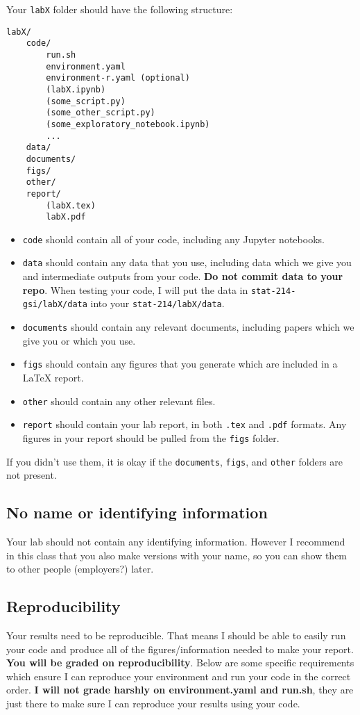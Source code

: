 \documentclass[letterpaper,12pt]{article}
\begin{document}
Your \texttt{labX} folder should have the following structure:
\begin{verbatim}
labX/
    code/
        run.sh
        environment.yaml
        environment-r.yaml (optional)
        (labX.ipynb)
        (some_script.py)
        (some_other_script.py)
        (some_exploratory_notebook.ipynb)
        ...
    data/
    documents/
    figs/
    other/
    report/
        (labX.tex)
        labX.pdf
\end{verbatim}
\begin{itemize}
    \item \texttt{code} should contain all of your code, including any Jupyter notebooks.
    \item  \texttt{data} should contain any data that you use, including data which we give you and intermediate outputs from your code. \textbf{Do not commit data to your repo}. When testing your code, I will put the data in \texttt{stat-214-gsi/labX/data} into your \texttt{stat-214/labX/data}.
    \item \texttt{documents} should contain any relevant documents, including papers which we give you or which you use.
    \item \texttt{figs} should contain any figures that you generate which are included in a LaTeX report.
    \item \texttt{other} should contain any other relevant files.
    \item \texttt{report} should contain your lab report, in both \texttt{.tex} and \texttt{.pdf} formats. Any figures in your report should be pulled from the \texttt{figs} folder.
\end{itemize}
If you didn't use them, it is okay if the \texttt{documents}, \texttt{figs}, and \texttt{other} folders are not present.

\subsection{No name or identifying information}
Your lab should not contain any identifying information. However I recommend in this class that you also make versions with your name, so you can show them to other people (employers?) later.

\subsection{Reproducibility}
Your results need to be reproducible. That means I should be able to easily run your code and produce all of the figures/information needed to make your report. \textbf{You will be graded on reproducibility}. Below are some specific requirements which ensure I can reproduce your environment and run your code in the correct order. \textbf{I will not grade harshly on environment.yaml and run.sh}, they are just there to make sure I can reproduce your results using your code.
\end{document}
